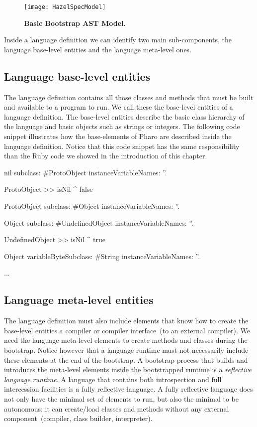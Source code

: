 \begin{figure}[ht]
\begin{center}
\texttt{[image: HazelSpecModel]}
\caption{\textbf{Basic Bootstrap AST Model.}\label{fig:hazelSpecModel}}
\end{center}
\end{figure}

Inside a language definition we can identify two main sub-components, the language base-level entities and the language meta-level ones.

\subsection{Language base-level entities}

The language definition contains all those classes and methods that must be built and available to a program to run. We call these the base-level entities of a language definition. The base-level entities describe the basic class hierarchy of the language and basic objects such as strings or integers. The following code snippet illustrates how the base-elements of Pharo are described inside the language definition. Notice that this code snippet has the same responsibility than the Ruby \VM code we showed in the introduction of this chapter.

\begin{code}
nil subclass: #ProtoObject
    instanceVariableNames: ''.

ProtoObject >> isNil
    ^ false

ProtoObject subclass: #Object
    instanceVariableNames: ''.

Object subclass: #UndefinedObject
    instanceVariableNames: ''.
    
UndefinedObject >> isNil
    ^ true
    
Object variableByteSubclass: #String
    instanceVariableNames: ''.
    
...
\end{code}

\subsection{Language meta-level entities}
The language definition must also include elements that know how to create the base-level entities \eg a compiler or compiler interface~(to an external compiler). We need the language meta-level elements to create methods and classes during the bootstrap. Notice however that a language runtime must not necessarily include these elements at the end of the bootstrap. A bootstrap process that builds and introduces the meta-level elements inside the bootstrapped runtime is a \emph{reflective language runtime}.
A language that contains both introspection and full intercession facilities is a fully reflective language. A fully reflective language does not only have the minimal set of elements to run, but also the minimal to be autonomous: it can create/load classes and methods without any external component~(compiler, class builder, interpreter).

